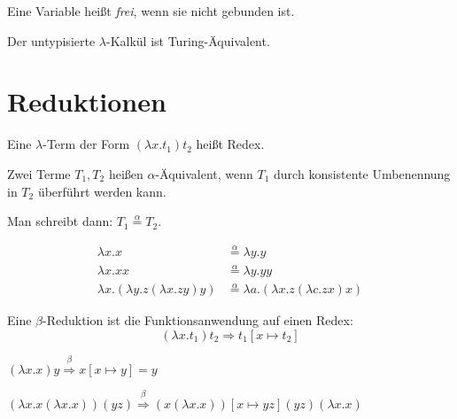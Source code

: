 \begin{definition}%
    Eine Variable heißt \textit{frei}, wenn sie nicht gebunden ist.
\end{definition}

\begin{satz}
    Der untypisierte $\lambda$-Kalkül ist Turing-Äquivalent.
\end{satz}

\section{Reduktionen}
\begin{definition}[Redex]%
    Eine $\lambda$-Term der Form $(\lambda x. t_1) t_2$ heißt Redex.
\end{definition}

\begin{definition}
    Zwei Terme $T_1, T_2$ heißen $\alpha$-Äquivalent, wenn $T_1$ durch 
    konsistente Umbenennung in $T_2$ überführt werden kann.

    Man schreibt dann: $T_1 \overset{\alpha}{=} T_2$.
\end{definition}

\begin{beispiel}
    \begin{align*}
        \lambda x.x    &\overset{\alpha}{=} \lambda y. y\\
        \lambda x. x x &\overset{\alpha}{=} \lambda y. y y\\
        \lambda x. (\lambda y. z (\lambda x. z y) y) &\overset{\alpha}{=}
        \lambda a. (\lambda x. z (\lambda c. z x) x)
    \end{align*}
\end{beispiel}

\begin{definition}
    Eine $\beta$-Reduktion ist die Funktionsanwendung auf einen Redex:
    \[(\lambda x. t_1) t_2 \Rightarrow t_1 [x \mapsto t_2]\]
\end{definition}

\begin{beispiel}
    \begin{defenum}
        \item $(\lambda x.x) y \overset{\beta}{\Rightarrow} x[x \mapsto y] = y$
        \item $(\lambda x. x (\lambda x. x)) (y z) \overset{\beta}{\Rightarrow} (x(\lambda x. x))[x \mapsto y z] (y z) (\lambda x. x)$
    \end{defenum}
\end{beispiel}

